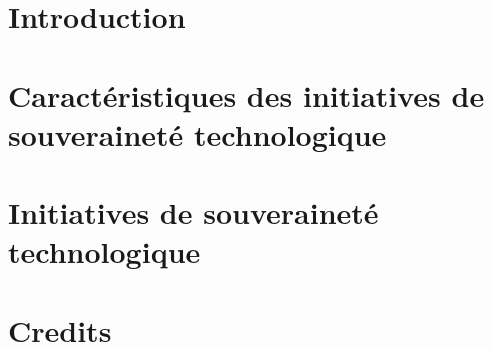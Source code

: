 \documentclass[a5paper,11pt]{book}
\begin{document}
\frontmatter
\pagestyle{empty}
\begin{center}
 \hspace{0pt}
  \vfill
  \vspace*{0.2\textheight}
  
  \vfill
 \hspace{0pt}
\end{center}
\pagebreak

\maketitle

\pagestyle{empty}


\pagestyle{fancy}

\tableofcontents
\thispagestyle{fancy}


\chapter{\prefacename}
\thispagestyle{fancy}


\mainmatter
\chapter{Introduction}
\thispagestyle{fancy}
 

\chapter{Caractéristiques des initiatives de souveraineté technologique}
 
 
 
 
 

\chapter{Initiatives de souveraineté technologique}
 
 
 
 
 

\chapter{Credits}
 
\end{document}
